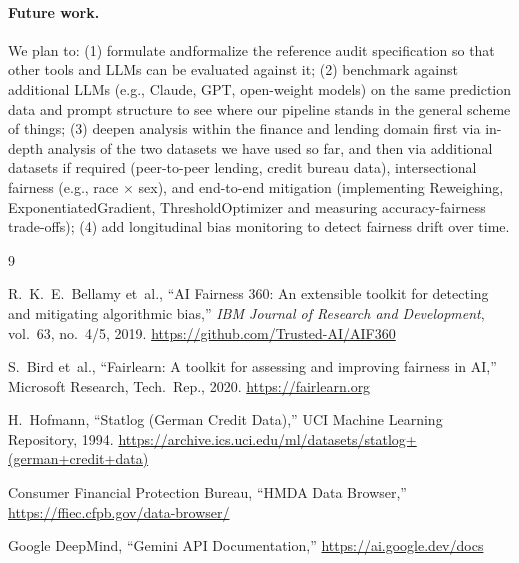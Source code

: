 \documentclass[11pt,a4paper]{article}
\begin{document}
\paragraph{Future work.}
We plan to: (1) formulate andformalize the reference audit specification so
that other tools and LLMs can be evaluated against it; (2) benchmark
against additional LLMs (e.g., Claude, GPT, open-weight models) on the
same prediction data and prompt structure to see where our pipeline stands
in the general scheme of things; (3) deepen analysis within the finance and
lending domain first via in-depth analysis of the two datasets we have used so far, and then via additional datasets if required (peer-to-peer lending, credit
bureau data), intersectional fairness (e.g., race $\times$ sex), and
end-to-end mitigation (implementing Reweighing, ExponentiatedGradient,
ThresholdOptimizer and measuring accuracy-fairness trade-offs); (4) add
longitudinal bias monitoring to detect fairness drift over time.

\begin{thebibliography}{9}

R.~K.~E.~Bellamy et~al.,
``AI Fairness 360: An extensible toolkit for detecting and mitigating
algorithmic bias,''
\textit{IBM Journal of Research and Development}, vol.~63, no.~4/5, 2019.
\url{https://github.com/Trusted-AI/AIF360}

S.~Bird et~al.,
``Fairlearn: A toolkit for assessing and improving fairness in AI,''
Microsoft Research, Tech.\ Rep., 2020.
\url{https://fairlearn.org}

H.~Hofmann,
``Statlog (German Credit Data),''
UCI Machine Learning Repository, 1994.
\url{https://archive.ics.uci.edu/ml/datasets/statlog+(german+credit+data)}

Consumer Financial Protection Bureau,
``HMDA Data Browser,''
\url{https://ffiec.cfpb.gov/data-browser/}

Google DeepMind,
``Gemini API Documentation,''
\url{https://ai.google.dev/docs}

\end{thebibliography}
\end{document}
